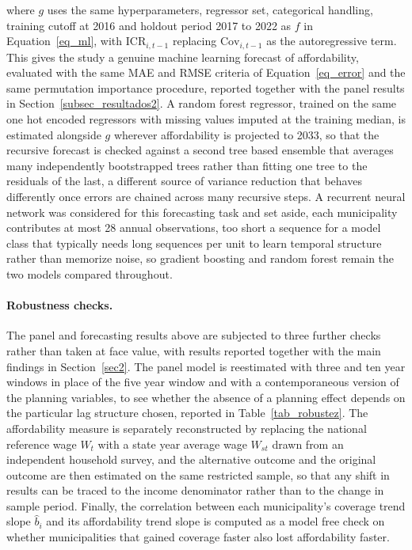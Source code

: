 \documentclass[pdflatex,sn-mathphys-num]{sn-jnl}%
\theoremstyle{thmstyleone}%
\theoremstyle{thmstyletwo}%
\theoremstyle{thmstylethree}%
\begin{document}
where $g$ uses the same hyperparameters, regressor set, categorical handling, training cutoff at 2016 and holdout period 2017 to 2022 as $f$ in Equation~\eqref{eq_ml}, with $\text{ICR}_{i,t-1}$ replacing $\text{Cov}_{i,t-1}$ as the autoregressive term. This gives the study a genuine machine learning forecast of affordability, evaluated with the same MAE and RMSE criteria of Equation~\eqref{eq_error} and the same permutation importance procedure, reported together with the panel results in Section~\ref{subsec_resultados2}. A random forest regressor, trained on the same one hot encoded regressors with missing values imputed at the training median, is estimated alongside $g$ wherever affordability is projected to 2033, so that the recursive forecast is checked against a second tree based ensemble that averages many independently bootstrapped trees rather than fitting one tree to the residuals of the last, a different source of variance reduction that behaves differently once errors are chained across many recursive steps. A recurrent neural network was considered for this forecasting task and set aside, each municipality contributes at most 28 annual observations, too short a sequence for a model class that typically needs long sequences per unit to learn temporal structure rather than memorize noise, so gradient boosting and random forest remain the two models compared throughout.

\paragraph{Robustness checks.}

The panel and forecasting results above are subjected to three further checks rather than taken at face value, with results reported together with the main findings in Section~\ref{sec2}. The panel model is reestimated with three and ten year windows in place of the five year window and with a contemporaneous version of the planning variables, to see whether the absence of a planning effect depends on the particular lag structure chosen, reported in Table~\ref{tab_robustez}. The affordability measure is separately reconstructed by replacing the national reference wage $W_t$ with a state year average wage $W_{st}$ drawn from an independent household survey, and the alternative outcome and the original outcome are then estimated on the same restricted sample, so that any shift in results can be traced to the income denominator rather than to the change in sample period. Finally, the correlation between each municipality's coverage trend slope $\hat{b}_i$ and its affordability trend slope is computed as a model free check on whether municipalities that gained coverage faster also lost affordability faster.
\end{document}
